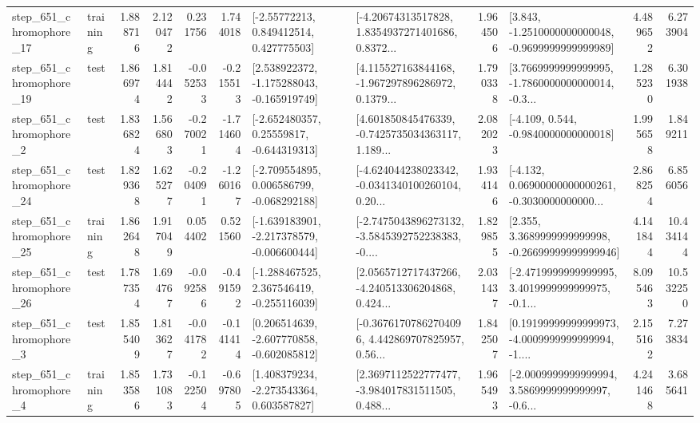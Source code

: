 \begin{tabular}{llrrrrllrlrr}
  step\_651\_chromophore\_17 &  training &      1.888716 &    2.120472 &      0.231756 &  1.744018 &     [-2.55772213, 0.849412514, 0.427775503] &  [-4.20674313517828, 1.8354937271401686, 0.8372... &       1.964506 &  [3.843, -1.2510000000000048, -0.9699999999999989] &            4.489652 &          6.273904 \\
  step\_651\_chromophore\_19 &      test &      1.866974 &    1.814442 &     -0.052533 & -0.215513 &   [2.538922372, -1.175288043, -0.165919749] &  [4.115527163844168, -1.967297896286972, 0.1379... &       1.790338 &  [3.7669999999999995, -1.7860000000000014, -0.3... &            1.285230 &          6.301938 \\
   step\_651\_chromophore\_2 &      test &      1.836824 &    1.566803 &     -0.270021 & -1.714604 &    [-2.652480357, 0.25559817, -0.644319313] &  [4.601850845476339, -0.7425735034363117, 1.189... &       2.082023 &               [-4.109, 0.544, -0.9840000000000018] &            1.995658 &          1.849211 \\
  step\_651\_chromophore\_24 &      test &      1.829368 &    1.625277 &     -0.204091 & -1.260167 &   [-2.709554895, 0.006586799, -0.068292188] &  [-4.624044238023342, -0.0341340100260104, 0.20... &       1.934146 &  [-4.132, 0.06900000000000261, -0.3030000000000... &            2.868254 &          6.856056 \\
  step\_651\_chromophore\_25 &  training &      1.862648 &    1.917049 &      0.054402 &  0.521560 &  [-1.639183901, -2.217378579, -0.006600444] &  [-2.7475043896273132, -3.5845392752238383, -0.... &       1.829855 &  [2.355, 3.3689999999999998, -0.26699999999999946] &            4.141844 &         10.434144 \\
  step\_651\_chromophore\_26 &      test &      1.787354 &    1.694767 &     -0.092586 & -0.491592 &   [-1.288467525, 2.367546419, -0.255116039] &  [2.0565712717437266, -4.240513306204868, 0.424... &       2.031437 &  [-2.4719999999999995, 3.4019999999999975, -0.1... &            8.095463 &         10.532250 \\
   step\_651\_chromophore\_3 &      test &      1.855409 &    1.813627 &     -0.041782 & -0.141414 &   [0.206514639, -2.607770858, -0.602085812] &  [-0.36761707862704096, 4.442869707825957, 0.56... &       1.842507 &  [0.19199999999999973, -4.0009999999999994, -1.... &            2.155162 &          7.273834 \\
   step\_651\_chromophore\_4 &  training &      1.853586 &    1.731083 &     -0.122504 & -0.697805 &    [1.408379234, -2.273543364, 0.603587827] &  [2.3697112522777477, -3.984017831511505, 0.488... &       1.965493 &  [-2.0009999999999994, 3.5869999999999997, -0.6... &            4.241468 &          3.685641 \\

\end{tabular}
